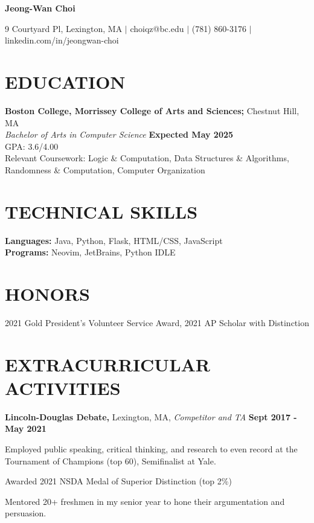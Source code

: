\documentclass[11pt]{article}
\begin{document}
\begin{center}
\textbf{\LARGE Jeong-Wan Choi}
\end{center}

\begin{center}
9 Courtyard Pl, Lexington, MA $|$ choiqz@bc.edu $|$ (781) 860-3176 $|$ linkedin.com/in/jeongwan-choi 
\end{center}

\section*{EDUCATION}
\textbf{Boston College, Morrissey College of Arts and Sciences;} Chestnut Hill, MA \\
\textit{Bachelor of Arts in Computer Science} \hfill \textbf{Expected May 2025} \\
GPA: 3.6/4.00 \\
Relevant Coursework: Logic \& Computation, Data Structures \& Algorithms, Randomness \& Computation, Computer Organization

\section*{TECHNICAL SKILLS}
\textbf{Languages:} Java, Python, Flask, HTML/CSS, JavaScript \\
\textbf{Programs:} Neovim, JetBrains, Python IDLE

\section*{HONORS}
2021 Gold President’s Volunteer Service Award, 2021 AP Scholar with Distinction

\section*{EXTRACURRICULAR ACTIVITIES}
\textbf{Lincoln-Douglas Debate,} Lexington, MA, \textit{Competitor and TA} \hfill \textbf{Sept 2017 - May 2021}
\begin{sublist}
  \item Employed public speaking, critical thinking, and research to even record at the Tournament of Champions (top 60), Semifinalist at Yale.
  \item Awarded 2021 NSDA Medal of Superior Distinction (top 2\%)
  \item Mentored 20+ freshmen in my senior year to hone their argumentation and persuasion.
\end{sublist}
\end{document}
